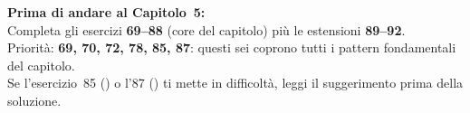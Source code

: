 \begin{workbook}
\textbf{Prima di andare al Capitolo~5:}\\[4pt]
Completa gli esercizi \textbf{69--88} (core del capitolo) più le
estensioni \textbf{89--92}.\\[4pt]
Priorità: \textbf{69, 70, 72, 78, 85, 87}: questi sei coprono
tutti i pattern fondamentali del capitolo.\\[4pt]
Se l'esercizio~85 () o l'87 () ti
mette in difficoltà, leggi il suggerimento prima della soluzione.
\end{workbook}
